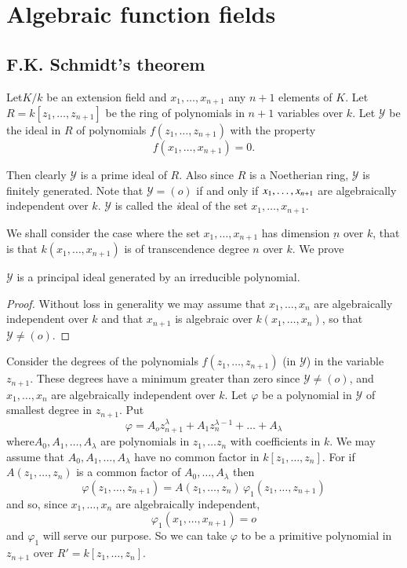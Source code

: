 \chapter{Algebraic function fields}\label{chap3}%

\section{F.K. Schmidt's theorem}\label{c3:s1}%

Let\pageoriginale $K/k$ be an extension field and $x_1, \ldots ,
x_{n+1}$ any $n+1$ elements of $K$. Let $R=k[z_1,\ldots ,z_{n+1}]$ be
the ring of polynomials in $n+1$ variables over $k$. Let $\mathscr{Y}$
be the ideal in $R$ of polynomials $f(z_1,\ldots,z_{n+1})$ with the
property  
$$
f(x_1,\ldots,x_{n+1})=0 .
$$

Then clearly $\mathscr{Y}$ is a prime ideal of $R$. Also since $R$ is
a Noetherian ring, $\mathscr{Y}$ is finitely generated. Note that
$\mathscr{Y}=(o)$ if and only if $x_1,\ldots,\break x_{n+1}$ are
algebraically independent over $k$. $\mathscr{Y}$ is called the
{\textit ideal of the set} $x_1,\ldots,x_{n+1}$. 

We shall consider the case where the set $x_1,\ldots , x_{n+1}$ has
dimension $\underbar{n}$ over $k$, that is that
$k(x_1,\ldots,x_{n+1})$ is of transcendence degree $n$ over $k$. We
prove 

\setcounter{thm}{0}
\begin{thm}\label{c3:thm1}%
$\mathscr{Y}$ is a principal ideal generated by an irreducible
  polynomial. 
\end{thm}

\begin{proof}
Without loss in generality we may assume that $x_1,\ldots,x_n$ are
algebraically independent over $k$ and that $x_{n+1}$ is algebraic
over\break
 $k(x_1,\ldots,x_n)$, so that $\mathscr{Y} \neq (o)$. 
\end{proof}

Consider the degrees of the polynomials $f(z_1,\ldots,z_{n+1})$ (in
$\mathscr{Y}$) in the variable $z_{n+1}$. These degrees have a minimum
greater than zero since $\mathscr{Y} \neq (o)$, and $x_1,\ldots , x_n$
are algebraically independent over $k$. Let $\varphi$ be a polynomial
in $\mathscr{Y}$ of smallest degree in $z_{n+1}$. Put 
$$
\varphi =A_o z^\lambda_{n+1}+A_1 z^{\lambda-1}_{n}+ \ldots+A_\lambda
$$
where\pageoriginale $A_0,A_1,\ldots,A_\lambda$ are polynomials in
$z_1,\ldots z_n$ 
with coefficients in $k$. We may assume that \; $A_0,A_1,\ldots
,A_\lambda$ \; have no common factor in \break $k[z_1,\ldots ,z_n]$. For if
$A(z_1,\ldots,z_n)$ is a common factor of $A_0,\ldots,A_\lambda$ then 
$$
\varphi(z_1,\ldots,z_{n+1})=A(z_1,\ldots,z_n) \, \varphi_1(z_1,\ldots,z_{n+1}) 
$$
and so, since $x_1,\ldots,x_n$ are algebraically independent,
$$
\varphi_1(x_1,\ldots,x_{n+1})=o
$$
and $\varphi_1$ will serve our purpose. So we can take $\varphi$ to be
a primitive polynomial in $z_{n+1}$ over $R'=k[z_1,\ldots,z_n]$. 

